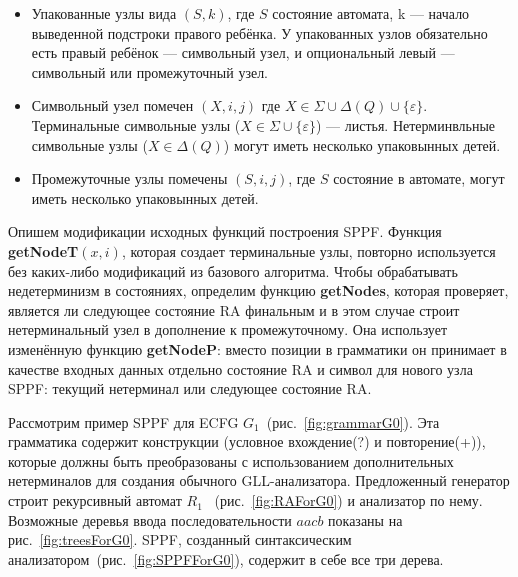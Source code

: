 \documentclass[14pt]{matmex-diploma-custom}
\begin{document}
	\begin{itemize}
		\item Упакованные узлы вида $(S, k)$, где $S$ состояние автомата, k --- начало выведенной
		подстроки правого ребёнка. У упакованных узлов обязательно есть правый ребёнок ---
		символьный узел, и опциональный левый --- символьный или промежуточный узел.
		\item Символьный узел помечен $(X, i, j)$ где $X \in \Sigma \cup \Delta(Q) \cup \{\varepsilon\}$.
		Терминальные символьные узлы ($X \in \Sigma \cup \{\varepsilon\}$) --- листья. 
		Нетерминвльные символьные узлы ($X \in \Delta(Q)$) могут иметь несколько упаковынных детей. 
		\item Промежуточные узлы помечены $ (S, i, j) $, где $S$ состояние в автомате, могут иметь несколько упаковынных детей.
	\end{itemize}
	
	Опишем модификации исходных функций построения SPPF.
	Функция \textbf{getNodeT$ (x, i) $}, которая создает терминальные узлы, 
	повторно используется без каких-либо модификаций из базового алгоритма.
	Чтобы обрабатывать недетерминизм в состояниях, определим функцию 
	\textbf{getNodes}, которая проверяет, является ли следующее состояние RA финальным
	и в этом случае строит нетерминальный узел в дополнение к промежуточному.
	Она использует изменённую функцию \textbf{getNodeP}: вместо позиции в грамматики он 
	принимает в качестве входных данных отдельно состояние RA и символ для нового узла SPPF:
	текущий нетерминал или следующее состояние RA.
	
	
	
	
	Рассмотрим пример SPPF для ECFG $ G_1 $~(рис.~\ref{fig:grammarG0}).
	Эта грамматика содержит конструкции (условное вхождение(?) и повторение(+)),
	которые должны быть преобразованы с использованием дополнительных нетерминалов 
	для создания обычного GLL-анализатора.
	Предложенный генератор строит рекурсивный автомат $ R_1 $ ~(рис.~\ref{fig:RAForG0})
	и анализатор по нему. Возможные деревья ввода последовательности $ aacb $ показаны 
	на рис.~\ref{fig:treesForG0}. SPPF, созданный синтаксическим анализатором~(рис.~\ref{fig:SPPFForG0}),
	содержит в себе все три дерева.
	
\end{document}
